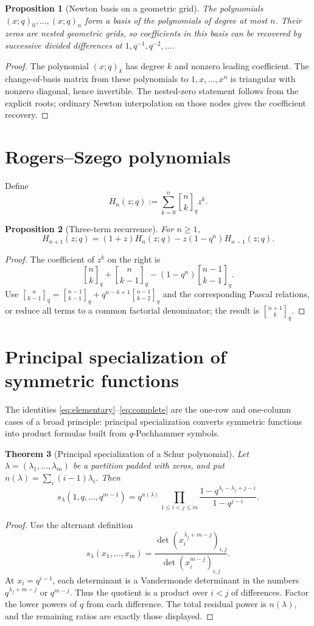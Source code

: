 \documentclass[11pt]{article}
\numberwithin{equation}{section}
\newtheorem{theorem}{Theorem}[section]
\newtheorem{proposition}[theorem]{Proposition}
\theoremstyle{definition}
\newcommand{\qbinom}[2]{\genfrac{[}{]}{0pt}{}{#1}{#2}_{q}}
\begin{document}
\begin{proposition}[Newton basis on a geometric grid]
The polynomials $(x;q)_0,\ldots,(x;q)_n$ form a basis of the polynomials of degree at most $n$.  Their zeros are nested geometric grids, so coefficients in this basis can be recovered by successive divided differences at $1,q^{-1},q^{-2},\ldots$.
\end{proposition}
\begin{proof}
The polynomial $(x;q)_k$ has degree $k$ and nonzero leading coefficient.  The change-of-basis matrix from these polynomials to $1,x,\ldots,x^n$ is triangular with nonzero diagonal, hence invertible.  The nested-zero statement follows from the explicit roots; ordinary Newton interpolation on those nodes gives the coefficient recovery.
\end{proof}

\section{Rogers--Szego polynomials}
Define
\[
H_n(z;q):=\sum_{k=0}^n\qbinom nk z^k.
\]
\begin{proposition}[Three-term recurrence]
For $n\ge1$,
\[
H_{n+1}(z;q)=(1+z)H_n(z;q)-z(1-q^n)H_{n-1}(z;q).
\]
\end{proposition}
\begin{proof}
The coefficient of $z^k$ on the right is
\[
\qbinom nk+\qbinom n{k-1}-(1-q^n)\genfrac{[}{]}{0pt}{}{n-1}{k-1}_q.
\]
Use
$\qbinom n{k-1}=\genfrac{[}{]}{0pt}{}{n-1}{k-1}_q+q^{n-k+1}\genfrac{[}{]}{0pt}{}{n-1}{k-2}_q$
and the corresponding Pascal relations, or reduce all terms to a common factorial denominator; the result is $\genfrac{[}{]}{0pt}{}{n+1}{k}_q$.
\end{proof}

\section{Principal specialization of symmetric functions}
The identities \eqref{eq:elementary}--\eqref{eq:complete} are the one-row and one-column cases of a broad principle: principal specialization converts symmetric functions into product formulas built from $q$-Pochhammer symbols.

\begin{theorem}[Principal specialization of a Schur polynomial]
Let $\lambda=(\lambda_1,\ldots,\lambda_m)$ be a partition padded with zeros, and put $n(\lambda)=\sum_i(i-1)\lambda_i$.  Then
\[
s_\lambda(1,q,\ldots,q^{m-1})
=q^{n(\lambda)}\prod_{1\le i<j\le m}
\frac{1-q^{\lambda_i-\lambda_j+j-i}}{1-q^{j-i}}.
\]
\end{theorem}
\begin{proof}
Use the alternant definition
\[
s_\lambda(x_1,\ldots,x_m)=
\frac{\det(x_i^{\lambda_j+m-j})_{i,j}}
     {\det(x_i^{m-j})_{i,j}}.
\]
At $x_i=q^{i-1}$, each determinant is a Vandermonde determinant in the numbers $q^{\lambda_j+m-j}$ or $q^{m-j}$.  Thus the quotient is a product over $i<j$ of differences.  Factor the lower powers of $q$ from each difference.  The total residual power is $n(\lambda)$, and the remaining ratios are exactly those displayed.
\end{proof}
\end{document}

